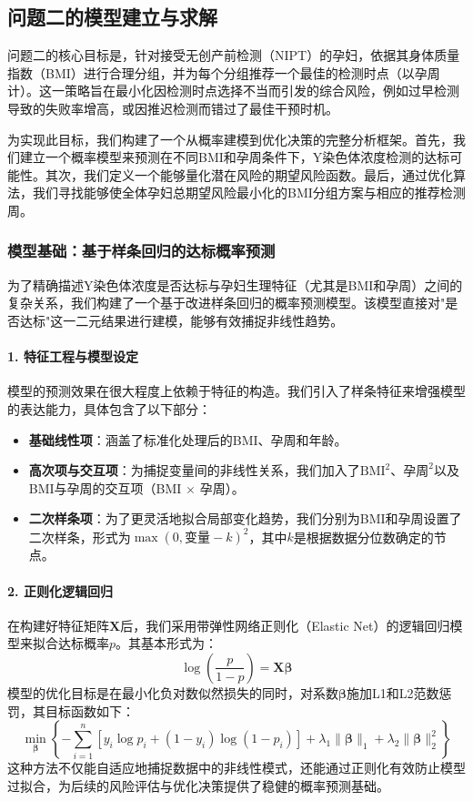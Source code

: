 \subsection{问题二的模型建立与求解}

问题二的核心目标是，针对接受无创产前检测（NIPT）的孕妇，依据其身体质量指数（BMI）进行合理分组，并为每个分组推荐一个最佳的检测时点（以孕周计）。这一策略旨在最小化因检测时点选择不当而引发的综合风险，例如过早检测导致的失败率增高，或因推迟检测而错过了最佳干预时机。

为实现此目标，我们构建了一个从概率建模到优化决策的完整分析框架。首先，我们建立一个概率模型来预测在不同BMI和孕周条件下，Y染色体浓度检测的达标可能性。其次，我们定义一个能够量化潜在风险的期望风险函数。最后，通过优化算法，我们寻找能够使全体孕妇总期望风险最小化的BMI分组方案与相应的推荐检测周。

\subsubsection{模型基础：基于样条回归的达标概率预测}

为了精确描述Y染色体浓度是否达标与孕妇生理特征（尤其是BMI和孕周）之间的复杂关系，我们构建了一个基于改进样条回归的概率预测模型。该模型直接对"是否达标"这一二元结果进行建模，能够有效捕捉非线性趋势。

\paragraph{1. 特征工程与模型设定}
模型的预测效果在很大程度上依赖于特征的构造。我们引入了样条特征来增强模型的表达能力，具体包含了以下部分：
\begin{itemize}
    \item \textbf{基础线性项}：涵盖了标准化处理后的BMI、孕周和年龄。
    \item \textbf{高次项与交互项}：为捕捉变量间的非线性关系，我们加入了$\text{BMI}^2$、$\text{孕周}^2$以及BMI与孕周的交互项（BMI $\times$ 孕周）。
    \item \textbf{二次样条项}：为了更灵活地拟合局部变化趋势，我们分别为BMI和孕周设置了二次样条，形式为$\max(0, \text{变量} - k)^2$，其中$k$是根据数据分位数确定的节点。
\end{itemize}

\paragraph{2. 正则化逻辑回归}
在构建好特征矩阵$\mathbf{X}$后，我们采用带弹性网络正则化（Elastic Net）的逻辑回归模型来拟合达标概率$p$。其基本形式为：
\begin{equation}
    \log\left(\frac{p}{1-p}\right) = \mathbf{X}\boldsymbol{\beta}
\end{equation}
模型的优化目标是在最小化负对数似然损失的同时，对系数$\boldsymbol{\beta}$施加L1和L2范数惩罚，其目标函数如下：
\begin{equation}
    \min_{\boldsymbol{\beta}} \left\{ -\sum_{i=1}^n \left[ y_i \log p_i + (1-y_i) \log(1-p_i) \right] + \lambda_1 \|\boldsymbol{\beta}\|_1 + \lambda_2 \|\boldsymbol{\beta}\|_2^2 \right\}
\end{equation}
这种方法不仅能自适应地捕捉数据中的非线性模式，还能通过正则化有效防止模型过拟合，为后续的风险评估与优化决策提供了稳健的概率预测基础。

